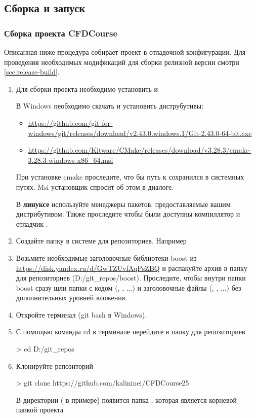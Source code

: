 \subsection{Сборка и запуск}
\label{sec:build}
\subsubsection{Сборка проекта CFDCourse}

Описанная ниже процедура собирает проект в отладочной конфигурации.
Для проведения необходимых модификаций для сборки релизной версии смотри \ref{sec:release-build}.

\label{sec:install-prep}
\begin{enumerate}
\item
Для сборки проекта необходимо установить  и 

В Windows необходимо скачать и установить диструбутивы:
\begin{itemize}
\item
\url{https://github.com/git-for-windows/git/releases/download/v2.43.0.windows.1/Git-2.43.0-64-bit.exe}
\item
\url{https://github.com/Kitware/CMake/releases/download/v3.28.3/cmake-3.28.3-windows-x86\_64.msi}
\end{itemize}

При установке cmake проследите, что бы путь к  сохранился в системных путях.
Msi установщик спросит об этом в диалоге.

В {\bf линуксе} используйте менеджеры пакетов, предоставляемые вашим дистрибутивом.
Также проследите чтобы были доступны компиллятор  и отладчик .

\item
Создайте папку в системе для репозиториев. Например 

\item
Возьмите необходимые заголовочные библиотеки boost из \url{https://disk.yandex.ru/d/GwTZUvfAqPsZBQ}
и распакуйте архив в папку для репозиториев (D:/git\_repos/boost).
Проследите, чтобы внутри папки boost сразу шли папки с кодом (, , ...)
и заголовочные файлы (, , ...)
без дополнительных уровней вложения.

\item
Откройте терминал (git bash в Windows).

\item
С помощью команды cd в терминале перейдите в папку для репозиториев
\begin{shelloutput}
> cd D:/git_repos
\end{shelloutput}

\item
Клонируйте репозиторий
\begin{shelloutput}
> git clone https://github.com/kalininei/CFDCourse25
\end{shelloutput}
В директории ( в примере) появится папка , которая является корневой папкой проекта
\end{enumerate}

